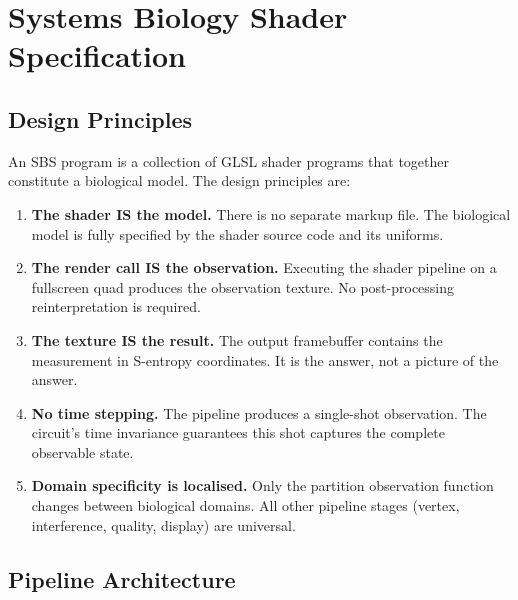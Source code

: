 \documentclass[11pt,twocolumn,a4paper]{article}
\begin{document}

\section{Systems Biology Shader Specification}
\label{sec:sbs-specification}

\subsection{Design Principles}

An SBS program is a collection of GLSL shader programs that together
constitute a biological model.  The design principles are:

\begin{enumerate}[leftmargin=*,itemsep=2pt]
\item \textbf{The shader IS the model.}  There is no separate markup
  file.  The biological model is fully specified by the shader source
  code and its uniforms.

\item \textbf{The render call IS the observation.}  Executing the
  shader pipeline on a fullscreen quad produces the observation
  texture.  No post-processing reinterpretation is required.

\item \textbf{The texture IS the result.}  The output framebuffer
  contains the measurement in S-entropy coordinates.  It is the answer,
  not a picture of the answer.

\item \textbf{No time stepping.}  The pipeline produces a single-shot
  observation.  The circuit's time invariance guarantees this shot
  captures the complete observable state.

\item \textbf{Domain specificity is localised.}  Only the partition
  observation function changes between biological domains.  All other
  pipeline stages (vertex, interference, quality, display) are
  universal.
\end{enumerate}

\subsection{Pipeline Architecture}
\end{document}
